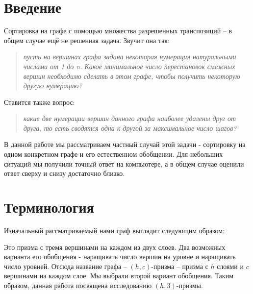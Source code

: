 \documentclass[a4paper,12pt]{llncs}
\begin{document}
\[\]
\[\]

\section{Введение}

Сортировка на графе с помощью множества разрешенных транспозиций -- в общем случае ещё не решенная задача. Звучит она так:
\begin{quote}
\textit{
пусть на вершинах графа задана некоторая нумерация натуральными числами от 1 до n. Какое минимальное число перестановок смежных
вершин необходимо сделать в этом графе, чтобы получить некоторую другую нумерацию?
}
\end{quote}
Ставится также вопрос:
\begin{quote}
\textit{
какие две нумерации вершин данного графа наиболее удалены друг от друга, то есть сводятся одна к другой за максимальное число шагов?
}
\end{quote}

В данной работе мы рассматриваем частный случай этой задачи - сортировку на одном конкретном графе и его естественном обобщении. Для небольших ситуаций мы получили точный ответ на компьютере, а в общем случае оценили ответ сверху и снизу достаточно близко.

\newpage
\section{Терминология}

Изначальный рассматриваемый нами граф выглядит следующим образом:

\begin{center}
\end{center}

	Это призма с тремя вершинами на каждом из двух слоев. Два возможных варианта его обобщения - наращивать число вершин на уровне
и наращивать число уровней. Отсюда название графа -- $(h, c)$-призма -- призма с $h$ слоями и $c$ вершинами на каждом слое. Мы выбрали второй
вариант обобщения. Таким образом, данная работа посвящена исследованию $(h, 3)$-призмы.
\end{document}
